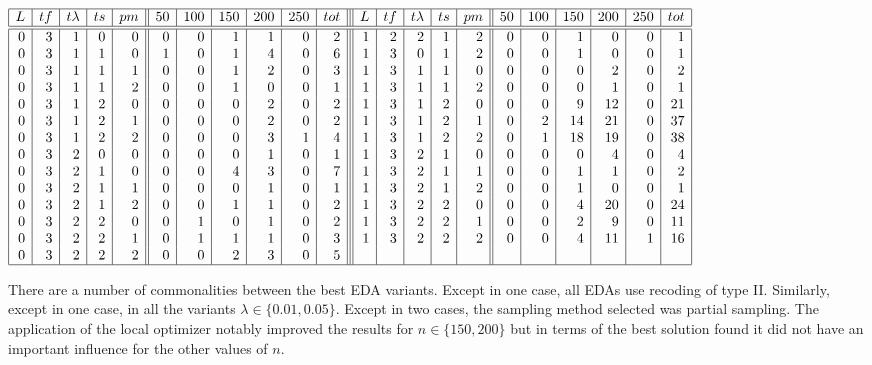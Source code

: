\begin{table}[htb]
\scriptsize
\begin{center}
 {$ \begin{array}{|r|r|r|r|r||r|r|r|r|r|r|||r|r|r|r|r||r|r|r|r|r|r|} \hline 
  L & tf& t \lambda & ts & pm &50 & 100 &150 & 200 &250 & tot & L & tf& t \lambda & ts & pm &50 & 100 &150 & 200 &250 & tot \\ \hline\hline 
  0&3& 1& 0& 0& 0& 0& 1& 1& 0& 2 & 1&2& 2& 1& 2& 0& 0& 1& 0& 0& 1\\  
  0&3& 1& 1& 0& 1& 0& 1& 4& 0& 6 &  1&3& 0& 1& 2& 0& 0& 1& 0& 0& 1\\ 
  0&3& 1& 1& 1& 0& 0& 1& 2& 0& 3 &  1&3& 1& 1& 0& 0& 0& 0& 2& 0& 2\\ 
  0&3& 1& 1& 2& 0& 0& 1& 0& 0& 1 &  1&3& 1& 1& 2& 0& 0& 0& 1& 0& 1\\ 
  0&3& 1& 2& 0& 0& 0& 0& 2& 0& 2 &  1&3& 1& 2& 0& 0& 0& 9& 12& 0& 21\\
  0&3& 1& 2& 1& 0& 0& 0& 2& 0& 2 &  1&3& 1& 2& 1& 0& 2& 14& 21& 0& 37\\ 
  0&3& 1& 2& 2& 0& 0& 0& 3& 1& 4 &  1&3& 1& 2& 2& 0& 1& 18& 19& 0& 38\\        
  0&3& 2& 0& 0& 0& 0& 0& 1& 0& 1 &   1&3& 2& 1& 0& 0& 0& 0& 4& 0& 4\\  
  0&3& 2& 1& 0& 0& 0& 4& 3& 0& 7 &   1&3& 2& 1& 1& 0& 0& 1& 1& 0& 2\\ 
  0&3& 2& 1& 1& 0& 0& 0& 1& 0& 1 &   1&3& 2& 1& 2& 0& 0& 1& 0& 0& 1\\ 
  0&3& 2& 1& 2& 0& 0& 1& 1& 0& 2 &   1&3& 2& 2& 0& 0& 0& 4& 20& 0& 24\\ 
  0&3& 2& 2& 0& 0& 1& 0& 1& 0& 2 &   1&3& 2& 2& 1& 0& 0& 2& 9& 0& 11\\ 
  0&3& 2& 2& 1& 0& 1& 1& 1& 0& 3 &   1&3& 2& 2& 2& 0& 0& 4& 11& 1& 16 \\
  0&3& 2& 2& 2& 0& 0& 2& 3& 0& 5 &    & &  &  &  &  &  &  &   &  &  \\\hline     
\end{array}$}
\caption{Results target $T_1$: EDA variants that reached one of the best solutions in at least one in the $100$ experiments. $L$: Local optimizer, tf: Type of function and representation, $t\lambda$: type of $\lambda$ value, $ts$: type of sampling, $pm$: probabilistic model.}
\label{tab:F5RES}
\end{center}
\end{table}


 There are a number of commonalities between the best EDA variants. Except in one case, all EDAs use recoding of type II. Similarly, except in one case, in all the variants $\lambda \in \{ 0.01, 0.05\}$. Except in two cases, the sampling method selected was partial sampling. The application of the local optimizer notably improved the results for $n \in \{150, 200\}$ but in terms of the best solution found it did not have an important influence for the other values of $n$. 

